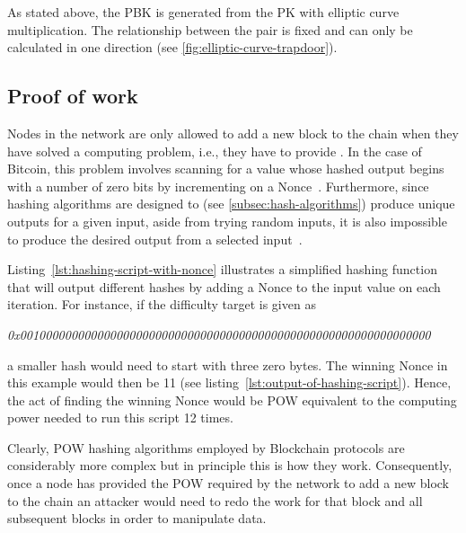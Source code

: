 As stated above, the \gls{PBK} is generated from the \gls{PK} with elliptic curve multiplication.
The relationship between the pair is fixed and can only be calculated in one direction (see \cref{fig:elliptic-curve-trapdoor}).

\subsection{Proof of work}\label{subsec:pow}

Nodes in the network are only allowed to add a new block to the chain when they have solved a computing problem, i.e., they have to provide .
In the case of Bitcoin, this problem involves scanning for a value whose hashed output begins with a number of zero bits by incrementing on a \gls{Nonce}~\autocite[3]{nakamoto_bitcoin_2008}.
Furthermore, since hashing algorithms are designed to (see \cref{subsec:hash-algorithms}) produce unique outputs for a given input, aside from trying random inputs, it is also impossible to produce the desired output from a selected input~\autocite[189]{antonopoulos_mastering_2017}.


Listing~\ref{lst:hashing-script-with-nonce} illustrates a simplified hashing function that will output different hashes by adding a \gls{Nonce} to the input value on each iteration.
For instance, if the difficulty target is given as

\smallskip
\begingroup\small\emph{0x0010000000000000000000000000000000000000000000000000000000000000}\endgroup
\smallskip

a smaller hash would need to start with three zero bytes.
The winning \gls{Nonce} in this example would then be 11 (see listing~\ref{lst:output-of-hashing-script}).
Hence, the act of finding the winning \gls{Nonce} would be \gls{POW} equivalent to the computing power needed to run this script 12 times.


Clearly, \gls{POW} hashing algorithms employed by \gls{Blockchain} protocols are considerably more complex but in principle this is how they work.
Consequently, once a node has provided the \gls{POW} required by the network to add a new block to the chain an attacker would need to redo the work for that block and all subsequent blocks in order to manipulate data.

